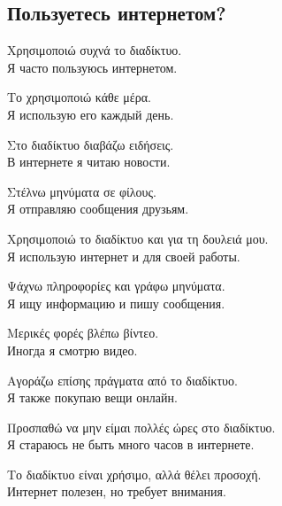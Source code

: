 \documentclass[12pt]{article}
\newcommand{\my}[1]{\textcolor{gray!80!white}{#1}}
\newenvironment{page}{\clearpage\normalsize\null\vfill}{\vfill\null}
\newenvironment{textblock}{\begin{minipage}{\textwidth}}{\end{minipage}\smallskip}
\begin{document}
	\begin{page}
		\subsection{Пользуетесь интернетом?}
		\small
		\begin{textblock}
			Χρησιμοποιώ συχνά το διαδίκτυο.\\
			\my{Я часто пользуюсь интернетом.}
			
			Το χρησιμοποιώ κάθε μέρα.\\
			\my{Я использую его каждый день.}
			
			Στο διαδίκτυο διαβάζω ειδήσεις.\\
			\my{В интернете я читаю новости.}
			
			Στέλνω μηνύματα σε φίλους.\\
			\my{Я отправляю сообщения друзьям.}
			
			Χρησιμοποιώ το διαδίκτυο και για τη δουλειά μου.\\
			\my{Я использую интернет и для своей работы.}
			
			Ψάχνω πληροφορίες και γράφω μηνύματα.\\
			\my{Я ищу информацию и пишу сообщения.}
			
			Μερικές φορές βλέπω βίντεο.\\
			\my{Иногда я смотрю видео.}
			
			Αγοράζω επίσης πράγματα από το διαδίκτυο.\\
			\my{Я также покупаю вещи онлайн.}
			
			Προσπαθώ να μην είμαι πολλές ώρες στο διαδίκτυο.\\
			\my{Я стараюсь не быть много часов в интернете.}
			
			Το διαδίκτυο είναι χρήσιμο, αλλά θέλει προσοχή.\\
			\my{Интернет полезен, но требует внимания.}
		\end{textblock}
	\end{page}
	
\end{document}
